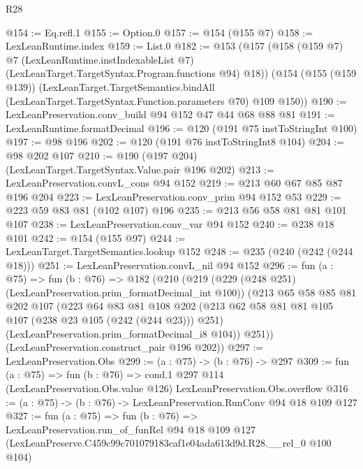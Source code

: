 \begin{lexlean}{R28}
\begin{coremodule}
@154 := Eq.refl.{1}
@155 := Option.{0}
@157 := @154 (@155 @7)
@158 := LexLeanRuntime.index
@159 := List.{0}
@182 := @153
    (@157
      (@158
        (@159 @7)
        @7
        (LexLeanRuntime.instIndexableList @7)
        (LexLeanTarget.TargetSyntax.Program.functions @94)
        @18))
    (@154
      (@155 (@159 @139))
      (LexLeanTarget.TargetSemantics.bindAll
        (LexLeanTarget.TargetSyntax.Function.parameters @70)
        @109
        @150))
@190 := LexLeanPreservation.conv_build @94 @152 @47 @44 @68 @88 @81
@191 := LexLeanRuntime.formatDecimal
@196 := @120 (@191 @75 instToStringInt @100)
@197 := @98 @196
@202 := @120 (@191 @76 instToStringInt8 @104)
@204 := @98 @202 @107
@210 := @190 (@197 @204) (LexLeanTarget.TargetSyntax.Value.pair @196 @202)
@213 := LexLeanPreservation.convL_cons @94 @152
@219 := @213 @60 @67 @85 @87 @196 @204
@223 := LexLeanPreservation.conv_prim @94 @152 @53
@229 := @223 @59 @83 @81 (@102 @107) @196
@235 := @213 @56 @58 @81 @81 @101 @107
@238 := LexLeanPreservation.conv_var @94 @152
@240 := @238 @18 @101
@242 := @154 (@155 @97)
@244 := LexLeanTarget.TargetSemantics.lookup @152
@248 := @235 (@240 (@242 (@244 @18)))
@251 := LexLeanPreservation.convL_nil @94 @152
@296 := fun (a : @75) =>
  fun (b : @76) =>
  @182
    (@210
      (@219
        (@229 (@248 @251) (LexLeanPreservation.prim_formatDecimal_int @100))
        (@213
          @65
          @58
          @85
          @81
          @202
          @107
          (@223
            @64
            @83
            @81
            @108
            @202
            (@213 @62 @58 @81 @81 @105 @107 (@238 @23 @105 (@242 (@244 @23))) @251)
            (LexLeanPreservation.prim_formatDecimal_i8 @104))
          @251))
      (LexLeanPreservation.construct_pair @196 @202))
@297 := LexLeanPreservation.Obs
@299 := (a : @75) -> (b : @76) -> @297
@309 := fun (a : @75) =>
  fun (b : @76) =>
  cond.{1} @297 @114 (LexLeanPreservation.Obs.value @126) LexLeanPreservation.Obs.overflow
@316 := (a : @75) -> (b : @76) -> LexLeanPreservation.RunConv @94 @18 @109 @127
@327 := fun (a : @75) =>
  fun (b : @76) =>
  LexLeanPreservation.run_of_funRel
    @94
    @18
    @109
    @127
    (LexLeanPreserve.C459c99c701079183caf1e04ada613d9d.R28.__rel_0 @100 @104)
\end{coremodule}
\end{lexlean}
